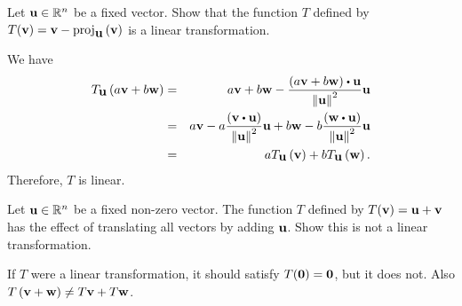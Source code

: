 \begin{enumialphparenastyle}
\begin{ex}
  Let $\mbox{\bf u}\in\mathbb{R}^n$ be a fixed vector.  Show that the function $T$
  defined by
  $T(\mbox{\bf v}) = \mbox{\bf v}-\mbox{\rm proj}_{\mbox{\bf u}}\left(\mbox{\bf v}\right)$ is a
  linear transformation.
  \begin{sol}
    We have
    \begin{eqnarray*}
      T_{\vect{u}}\tup{a\vect{v}+b\vect{w}}
      &=& a\vect{v}+b\vect{w}
          -\frac{(a\vect{v}+b\vect{w})\dotprod\vect{u}}{\norm{\vect{u}}^{2}}
          \vect{u} \\
      &=& a\vect{v}
          -a\frac{\tup{\vect{v}\dotprod\vect{u}}}{\norm{\vect{u}}^{2}}\vect{u}
          +b\vect{w}
          -b\frac{\tup{\vect{w}\dotprod\vect{u}}}{\norm{\vect{u}}^{2}}\vect{u} \\
      &=& aT_{\vect{u}}\tup{\vect{v}} +bT_{\vect{u}}\tup{\vect{w}}.
    \end{eqnarray*}
    Therefore, $T$ is linear.
  \end{sol}
\end{ex}

\begin{ex}
  Let $\mbox{\bf u}\in\mathbb{R}^n$ be a fixed non-zero vector. The function $T$
  defined by $T(\mbox{\bf v})=\mbox{\bf u}+\mbox{\bf v}$ has the effect of
  translating all vectors by adding $\mbox{\bf u}$. Show this is not a
  linear transformation. 
  \begin{sol}
    If $T$ were a linear transformation, it should satisfy
    $T(\mbox{\bf 0}) = \mbox{\bf 0}$, but it does not. Also
    $T\left(\mbox{\bf v}+\mbox{\bf w}\right) \neq T\mbox{\bf v}+T\mbox{\bf w}$.
  \end{sol}
\end{ex}

\end{enumialphparenastyle}
